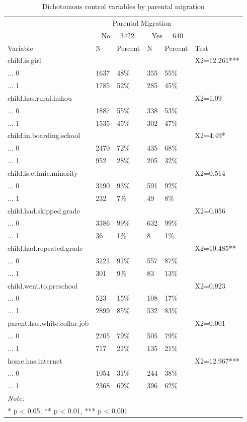 \documentclass[
  man,floatsintext]{apa7}
\begin{document}
\begin{table}

\caption{\label{tab:unnamed-chunk-3}Dichotomous control variables by parental migration}
\centering
\begin{tabular}[t]{llllll}
\toprule
\multicolumn{1}{c}{ } & \multicolumn{4}{c}{Parental Migration} \\
\cmidrule(l{3pt}r{3pt}){2-5}
\multicolumn{1}{c}{ } & \multicolumn{2}{c}{No = 3422} & \multicolumn{2}{c}{Yes = 640} \\
\cmidrule(l{3pt}r{3pt}){2-3} \cmidrule(l{3pt}r{3pt}){4-5}
Variable & N & Percent & N & Percent & Test\\
\midrule
child.is.girl &  &  &  &  & X2=12.261***\\
... 0 & 1637 & 48\% & 355 & 55\% & \\
... 1 & 1785 & 52\% & 285 & 45\% & \\
child.has.rural.hukou &  &  &  &  & X2=1.09\\
... 0 & 1887 & 55\% & 338 & 53\% & \\
\addlinespace
... 1 & 1535 & 45\% & 302 & 47\% & \\
child.in.boarding.school &  &  &  &  & X2=4.49*\\
... 0 & 2470 & 72\% & 435 & 68\% & \\
... 1 & 952 & 28\% & 205 & 32\% & \\
child.is.ethnic.minority &  &  &  &  & X2=0.514\\
\addlinespace
... 0 & 3190 & 93\% & 591 & 92\% & \\
... 1 & 232 & 7\% & 49 & 8\% & \\
child.had.skipped.grade &  &  &  &  & X2=0.056\\
... 0 & 3386 & 99\% & 632 & 99\% & \\
... 1 & 36 & 1\% & 8 & 1\% & \\
\addlinespace
child.had.repeated.grade &  &  &  &  & X2=10.485**\\
... 0 & 3121 & 91\% & 557 & 87\% & \\
... 1 & 301 & 9\% & 83 & 13\% & \\
child.went.to.preschool &  &  &  &  & X2=0.923\\
... 0 & 523 & 15\% & 108 & 17\% & \\
\addlinespace
... 1 & 2899 & 85\% & 532 & 83\% & \\
parent.has.white.collar.job &  &  &  &  & X2=0.001\\
... 0 & 2705 & 79\% & 505 & 79\% & \\
... 1 & 717 & 21\% & 135 & 21\% & \\
home.has.internet &  &  &  &  & X2=12.967***\\
\addlinespace
... 0 & 1054 & 31\% & 244 & 38\% & \\
... 1 & 2368 & 69\% & 396 & 62\% & \\
\bottomrule
\multicolumn{6}{l}{\rule{0pt}{1em}\textit{Note: }}\\
\multicolumn{6}{l}{\rule{0pt}{1em}* p < 0.05, ** p < 0.01, *** p < 0.001}\\
\end{tabular}
\end{table}
\end{document}
